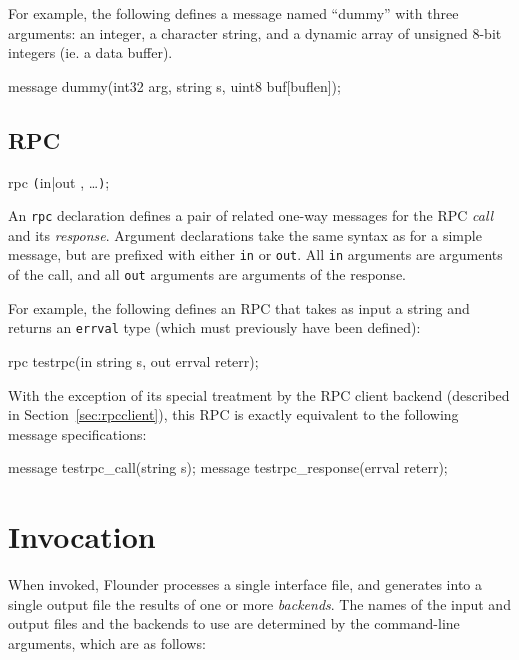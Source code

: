 \documentclass[a4paper,twoside]{report} %
\begin{document}
For example, the following defines a message named ``dummy'' with three
arguments: an integer, a character string, and a dynamic array of unsigned 8-bit
integers (ie. a data buffer).

\begin{example}
  message dummy(int32 arg, string s, uint8 buf[buflen]);
\end{example}

\subsection{RPC}\label{sec:lang:rpc}

\begin{syntax}
rpc  \verb+(+in|out , \ldots \verb+)+;
\end{syntax}

An \texttt{rpc} declaration defines a pair of related one-way messages for the
RPC \emph{call} and its \emph{response}. Argument declarations take the same
syntax as for a simple message, but are prefixed with either \texttt{in} or
\texttt{out}. All \texttt{in} arguments are arguments of the call, and all
\texttt{out} arguments are arguments of the response.

For example, the following defines an RPC that takes as input a string
and returns an \texttt{errval} type (which must previously have been defined):

\begin{example}
  rpc testrpc(in string s, out errval reterr);
\end{example}

With the exception of its special treatment by the RPC client backend
(described in Section~\ref{sec:rpcclient}), this RPC is exactly equivalent
to the following message specifications:

\begin{example}
  message testrpc_call(string s);
  message testrpc_response(errval reterr);
\end{example}

\section{Invocation}

When invoked, Flounder processes a single interface file, and generates into a
single output file the results of one or more \emph{backends}. The names of the
input and output files and the backends to use are determined by the
command-line arguments, which are as follows:
\end{document}
